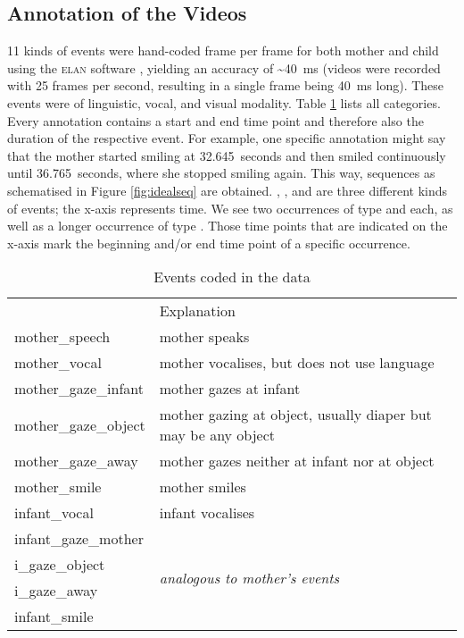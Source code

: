 \subsection{Annotation of the Videos}
\label{ssec:fpmmetann}
11 kinds of events were hand-coded frame per frame for both mother and child using the \textsc{elan} software \citep{wittenburg_elan_2006}, yielding an accuracy of \textasciitilde40~ms (videos were recorded with 25 frames per second, resulting in a single frame being 40~ms long).
These events were of linguistic, vocal, and visual modality. %
Table \ref{tab:events} lists all categories.
Every annotation contains a start and end time point and therefore also the duration of the respective event.
For example, one specific annotation might say that the mother started smiling at 32.645~seconds and then smiled continuously until 36.765~seconds, where she stopped smiling again.
This way, sequences as schematised in Figure \ref{fig:idealseq} are obtained.
, , and  are three different kinds of events; the x-axis represents time.
We see two occurrences of type  and  each, as well as a longer occurrence of type .
Those time points that are indicated on the x-axis mark the beginning and/or end time point of a specific occurrence.

\begin{table}
	\centering
	\begin{tabularx}{\textwidth}{>{\ttfamily}lX} 
		\toprule
		{\rmfamily Event}	& Explanation \\
		\cmidrule(lr){1-1} \cmidrule(lr){2-2}
		mother\_speech		& mother speaks \\
		mother\_vocal		& mother vocalises, but does not use language \\
		mother\_gaze\_infant& mother gazes at infant \\
		mother\_gaze\_object& mother gazing at object, usually diaper but may be any object \\
		mother\_gaze\_away	& mother gazes neither at infant nor at object \\
		mother\_smile		& mother smiles \\
		\midrule
		infant\_vocal		& infant vocalises \\
		\cmidrule(lr){2-2}
		infant\_gaze\_mother& \multirow{4}{*}{\textit{analogous to mother's events}} \\
		i\_gaze\_object	\\
		i\_gaze\_away \\
		infant\_smile \\
		\bottomrule
	\end{tabularx}
	\caption{Events coded in the data}
	\label{tab:events}
\end{table}

